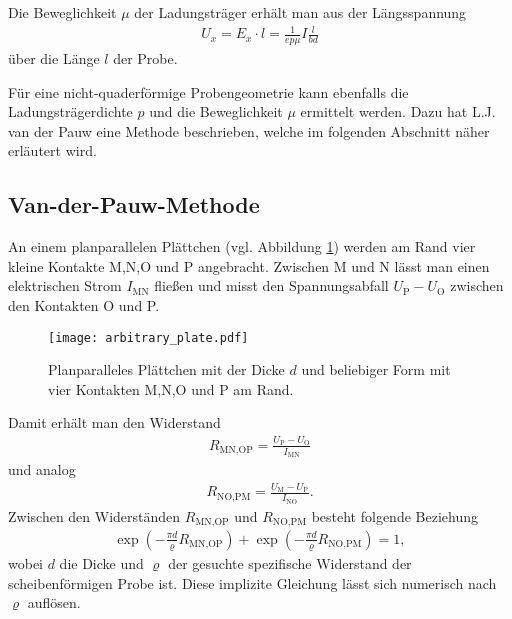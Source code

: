\newpage
Die Beweglichkeit $\mu$ der Ladungsträger erhält man aus der Längsspannung
\begin{align}
U_x=E_x\cdot l=\frac{1}{ep\mu}I\frac{l}{bd}
\end{align}
über die Länge $l$ der Probe.

Für eine nicht-quaderförmige Probengeometrie kann ebenfalls die Ladungsträgerdichte $p$ und die Beweglichkeit $\mu$ ermittelt werden. Dazu hat L.J. van der Pauw eine Methode beschrieben, welche im folgenden Abschnitt näher erläutert wird.
\subsection{Van-der-Pauw-Methode}
An einem planparallelen Plättchen (vgl. Abbildung \ref{fig:vdP}) werden am Rand vier kleine Kontakte M,N,O und P angebracht. Zwischen M und N lässt man einen elektrischen Strom $I_\text{MN}$ fließen und misst den Spannungsabfall $U_\text{P}-U_\text{O}$ zwischen den Kontakten O und P.
\begin{figure}[h]
\centering
\texttt{[image: arbitrary\_plate.pdf]}
\caption{Planparalleles Plättchen mit der Dicke $d$ und beliebiger Form mit vier Kontakten M,N,O und P am Rand.}
\label{fig:vdP}
\end{figure}

 Damit erhält man den Widerstand
\begin{align}
R_\text{MN,OP}=\frac{U_\text{P}-U_\text{O}}{I_\text{MN}}
\end{align}
und analog
\begin{align}
R_\text{NO,PM}=\frac{U_\text{M}-U_\text{P}}{I_\text{NO}}.
\end{align}
Zwischen den Widerständen $R_\text{MN,OP}$ und $R_\text{NO,PM}$ besteht folgende Beziehung
\begin{align}
\exp\left(-\frac{\pi d}{\varrho}R_\text{MN,OP}\right)+\exp\left(-\frac{\pi d}{\varrho}R_\text{NO,PM}\right)=1,
\end{align}
wobei $d$ die Dicke und $\varrho$ der gesuchte spezifische Widerstand der scheibenförmigen Probe ist. Diese implizite Gleichung lässt sich numerisch nach $\varrho$ auflösen.

